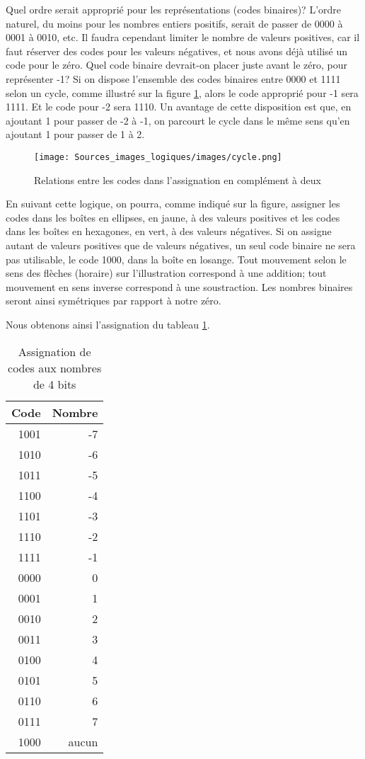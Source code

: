 \documentclass[letter, oneside]{book}
\begin{document}
Quel ordre serait approprié pour les représentations (codes binaires)?
L'ordre naturel, du moins pour les nombres entiers positifs, serait de
passer de 0000 à 0001 à 0010, etc. Il faudra cependant limiter le
nombre de valeurs positives, car il faut réserver des codes pour les
valeurs négatives, et nous avons déjà utilisé un code pour le
zéro. Quel code binaire devrait-on placer juste avant le zéro, pour
représenter -1? Si on dispose l'ensemble des codes binaires entre 0000
et 1111 selon un cycle, comme illustré sur la figure
\ref{fig:orgdc414e7}, alors le code approprié pour -1 sera 1111. Et le
code pour -2 sera 1110. Un avantage de cette disposition est que, en
ajoutant 1 pour passer de -2 à -1, on parcourt le cycle dans le même
sens qu'en ajoutant 1 pour passer de 1 à 2.

\begin{figure}[htbp]
\centering
\texttt{[image: Sources\_images\_logiques/images/cycle.png]}
\caption{\label{fig:orgdc414e7}Relations entre les codes dans l'assignation en complément à deux}
\end{figure}

En suivant cette logique, on pourra, comme indiqué sur la figure,
assigner les codes dans les boîtes en ellipses, en jaune, à des
valeurs positives et les codes dans les boîtes en hexagones, en vert,
à des valeurs négatives. Si on assigne autant de valeurs positives que
de valeurs négatives, un seul code binaire ne sera pas utilisable, le
code 1000, dans la boîte en losange. Tout mouvement selon le sens des
flèches (horaire) sur l'illustration correspond à une addition;
tout mouvement en sens inverse correspond à une soustraction. Les nombres
binaires seront ainsi symétriques par rapport à notre zéro.

Nous obtenons ainsi l'assignation du tableau \ref{tab:orge43693c}.

\begin{table}[htbp]
\caption{\label{tab:orge43693c}Assignation de codes aux nombres de 4 bits}
\centering
\begin{tabular}{rr}
Code & Nombre\\[0pt]
\hline
1001 & -7\\[0pt]
1010 & -6\\[0pt]
1011 & -5\\[0pt]
1100 & -4\\[0pt]
1101 & -3\\[0pt]
1110 & -2\\[0pt]
1111 & -1\\[0pt]
0000 & 0\\[0pt]
0001 & 1\\[0pt]
0010 & 2\\[0pt]
0011 & 3\\[0pt]
0100 & 4\\[0pt]
0101 & 5\\[0pt]
0110 & 6\\[0pt]
0111 & 7\\[0pt]
1000 & aucun\\[0pt]
\end{tabular}
\end{table}
\end{document}
